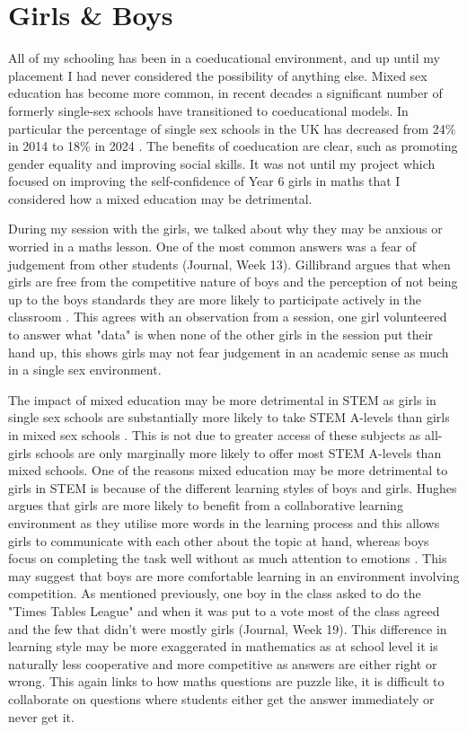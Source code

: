 \documentclass[11pt, a4paper, notitlepage]{article}
\begin{document}
\section*{Girls \& Boys}
All of my schooling has been in a coeducational environment, and up until my placement I had never considered the possibility of anything else. Mixed sex education has become more common, in recent decades a significant number of formerly single-sex schools have transitioned to coeducational models. In particular the percentage of single sex schools in the UK has decreased from 24\% in 2014 to 18\% in 2024 \cite{ICS:2014,ICS:2024}. The benefits of coeducation are clear, such as promoting gender equality and improving social skills. It was not until my project which focused on improving the self-confidence of Year 6 girls in maths that I considered how a mixed education may be detrimental.
\par
During my session with the girls, we talked about why they may be anxious or worried in a maths lesson. One of the most common answers was a fear of judgement from other students (Journal, Week 13). Gillibrand argues that when girls are free from the competitive nature of boys and the perception of not being up to the boys standards they are more likely to participate actively in the classroom \cite{Gillibrand:1999}. This agrees with an observation from a session, one girl volunteered to answer what "data" is when none of the other girls in the session put their hand up, this shows girls may not fear judgement in an academic sense as much in a single sex environment. 
\par
The impact of mixed education may be more detrimental in STEM as girls in single sex schools are substantially more likely to take STEM A-levels than girls in mixed sex schools \cite{Anders:2022}. This is not due to greater access of these subjects as all-girls schools are only marginally more likely to offer most STEM A-levels than mixed schools. One of the reasons mixed education may be more detrimental to girls in STEM is because of the different learning styles of boys and girls. Hughes argues that girls are more likely to benefit from a collaborative learning environment as they utilise more words in the learning process and this allows girls to communicate with each other about the topic at hand, whereas boys focus on completing the task well without as much attention to emotions \cite{Hughes:2006}.
This may suggest that boys are more comfortable learning in an environment involving competition. As mentioned previously, one boy in the class asked to do the "Times Tables League" and when it was put to a vote most of the class agreed and the few that didn't were mostly girls (Journal, Week 19). This difference in learning style may be more exaggerated in mathematics as at school level it is naturally less cooperative and more competitive as answers are either right or wrong. This again links to how maths questions are puzzle like, it is difficult to collaborate on questions where students either get the answer immediately or never get it.
\end{document}
